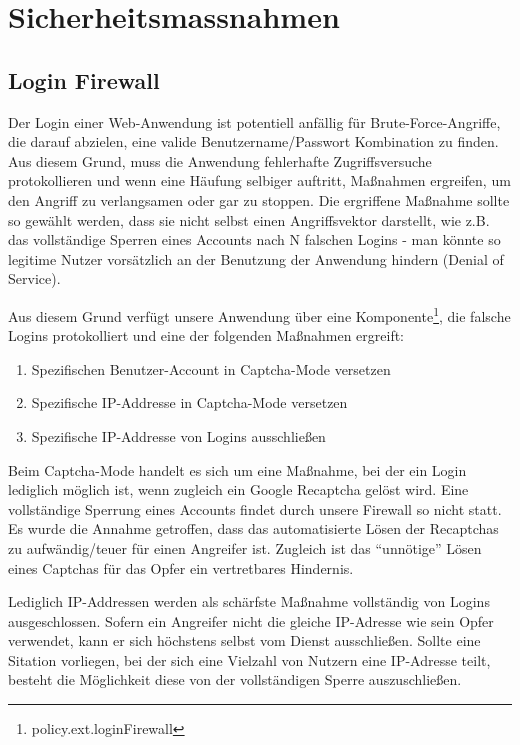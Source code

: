 \documentclass[12pt,DIV14,BCOR10mm,a4paper,twoside,parskip=half-,headsepline,headinclude,english,ngerman,bibliography=totocnumbered]{scrreprt}
\begin{document}
\chapter{Sicherheitsmassnahmen}

\section{Login Firewall}
Der Login einer Web-Anwendung ist potentiell anfällig für Brute-Force-Angriffe, die darauf abzielen, eine valide Benutzername/Passwort Kombination zu finden. Aus diesem Grund, muss die Anwendung fehlerhafte Zugriffsversuche protokollieren und wenn eine Häufung selbiger auftritt, Maßnahmen ergreifen, um den Angriff zu verlangsamen oder gar zu stoppen. Die ergriffene Maßnahme sollte so gewählt werden, dass sie nicht selbst einen Angriffsvektor darstellt, wie z.B. das vollständige Sperren eines Accounts nach N falschen Logins - man könnte so legitime Nutzer vorsätzlich an der Benutzung der Anwendung hindern (Denial of Service).

Aus diesem Grund verfügt unsere Anwendung über eine Komponente\footnote{policy.ext.loginFirewall}, die falsche Logins protokolliert und eine der folgenden Maßnahmen ergreift:

\begin{enumerate}
\item Spezifischen Benutzer-Account in Captcha-Mode versetzen
\item Spezifische IP-Addresse in Captcha-Mode versetzen
\item Spezifische IP-Addresse von Logins ausschließen
\end{enumerate}

Beim Captcha-Mode handelt es sich um eine Maßnahme, bei der ein Login lediglich möglich ist, wenn zugleich ein Google Recaptcha gelöst wird. Eine vollständige Sperrung eines Accounts findet durch unsere Firewall so nicht statt. Es wurde die Annahme getroffen, dass das automatisierte Lösen der Recaptchas zu aufwändig/teuer für einen Angreifer ist. Zugleich ist das ``unnötige'' Lösen eines Captchas für das Opfer ein vertretbares Hindernis.

Lediglich IP-Addressen werden als schärfste Maßnahme vollständig von Logins ausgeschlossen. Sofern ein Angreifer nicht die gleiche IP-Adresse wie sein Opfer verwendet, kann er sich höchstens selbst vom Dienst ausschließen. Sollte eine Sitation vorliegen, bei der sich eine Vielzahl von Nutzern eine IP-Adresse teilt, besteht die Möglichkeit diese von der vollständigen Sperre auszuschließen.
\end{document}

